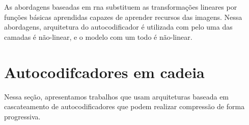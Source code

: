 As abordagens baseadas em \acrshort{rna} \cite{Variable2016Toderici,Priming2017Johnston,target,Priming2017Johnston,FullResolution2017Toderici,End2016Balle,Autoregressive2018Minnen,Lossy2017Theis,Variational2018Balle,zhao1901cae} substituem as transformações lineares por funções básicas aprendidas capazes de aprender recursos das imagens. Nessa abordagens, arquitetura do autocodificador é utilizada com pelo uma das camadas é não-linear, e o modelo com um todo é não-linear.   

  



  











\section{Autocodifcadores em cadeia}
Nessa seção, apresentamos trabalhos que usam arquiteturas baseada em cascateamento de autocodificadores que podem realizar compressão de forma progressiva.   


